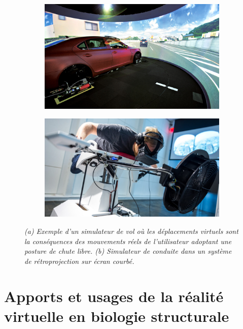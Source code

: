 \begin{figure}[h]
  \begin{subfigure}{.5\textwidth}
  \centering
  {\includegraphics[width=0.9\linewidth]{./figures/ch3/driving_simu}}
    \caption{}
    \label{Fig:driving_simu}
  \end{subfigure}
  \begin{subfigure}{.5\textwidth}
  \centering
  {\includegraphics[width=0.9\linewidth]{./figures/ch3/flight_simu}}
    \caption{}
    \label{Fig:flight_simu}
  \hspace{0.3cm}
  \end{subfigure}
  \caption{\it (a) Exemple d'un simulateur de vol où les déplacements virtuels sont la conséquences des mouvements réels de l'utilisateur adoptant une posture de chute libre.
  (b) Simulateur de conduite dans un système de rétroprojection sur écran courbé.
  }
\end{figure}



\section{Apports et usages de la réalité virtuelle en biologie structurale} \label{RV_for_bio_struct}

